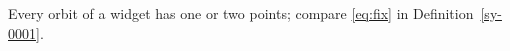 \begin{lemma}[Orbits]\label{sy-0002}
Every orbit of a widget has one or two points; compare \eqref{eq:fix} in Definition~\ref{sy-0001}.
\end{lemma}